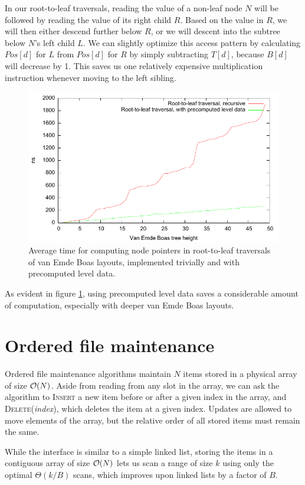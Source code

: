In our root-to-leaf traversals, reading the value of a non-leaf node $N$ will be
followed by reading the value of its right child $R$. Based on the value in
$R$, we will then either descend further below $R$, or we will descent into
the subtree below $N$'s left child $L$.
We can slightly optimize this access pattern by calculating $Pos[d]$ for $L$
from $Pos[d]$ for $R$ by simply subtracting $T[d]$, because $B[d]$ will
decrease by 1. This saves us one relatively expensive multiplication
instruction whenever moving to the left sibling.

\begin{figure}
\centering
\includegraphics{img/veb-drilldown-speed}
\caption{Average time for computing node pointers in root-to-leaf traversals
	of van Emde Boas layouts, implemented trivially and with precomputed
	level data.}
\label{fig:veb_drilldown_speed}
\end{figure}
As evident in figure \ref{fig:veb_drilldown_speed}, using precomputed level data
saves a considerable amount of computation, especially with deeper van Emde Boas
layouts.

\section{Ordered file maintenance}
Ordered file maintenance algorithms maintain $N$ items stored in a physical
array of size $\mathcal{O}(N)$. Aside from reading from any slot in the array,
we can ask the algorithm to \textsc{Insert} a new item before or after
a given index in the array, and \textsc{Delete}(\emph{index}), which deletes
the item at a given index. Updates are allowed to move elements of the array,
but the relative order of all stored items must remain the same.

While the interface is similar to a simple linked list, storing the items
in a contiguous array of size $\mathcal{O}(N)$ lets us scan a range of size $k$ using
only the optimal $\Theta(k/B)$ scans, which improves upon linked lists by
a factor of $B$.

